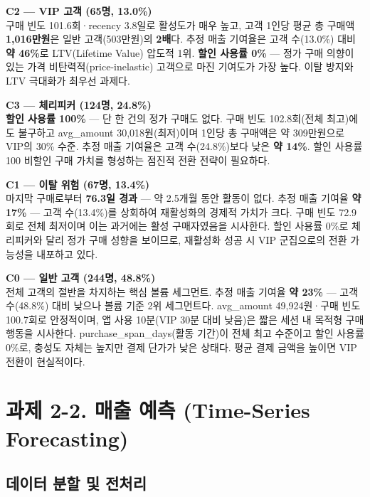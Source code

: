 \documentclass[a4paper, 11pt]{article}
\begin{document}
\textbf{C2 — VIP 고객 (65명, 13.0\%)}\\
구매 빈도 101.6회·recency 3.8일로 활성도가 매우 높고,
고객 1인당 평균 총 구매액 \textbf{1,016만원}은 일반 고객(503만원)의 \textbf{2배}다.
추정 매출 기여율은 고객 수(13.0\%) 대비 \textbf{약 46\%}로 LTV(Lifetime Value) 압도적 1위.
\textbf{할인 사용률 0\%} — 정가 구매 의향이 있는 가격 비탄력적(price-inelastic) 고객으로
마진 기여도가 가장 높다. 이탈 방지와 LTV 극대화가 최우선 과제다.

\medskip
\textbf{C3 — 체리피커 (124명, 24.8\%)}\\
\textbf{할인 사용률 100\%} — 단 한 건의 정가 구매도 없다.
구매 빈도 102.8회(전체 최고)에도 불구하고 avg\_amount 30,018원(최저)이며
1인당 총 구매액은 약 309만원으로 VIP의 30\% 수준.
추정 매출 기여율은 고객 수(24.8\%)보다 낮은 \textbf{약 14\%}.
할인 사용률 100%
비할인 구매 가치를 형성하는 점진적 전환 전략이 필요하다.

\medskip
\textbf{C1 — 이탈 위험 (67명, 13.4\%)}\\
마지막 구매로부터 \textbf{76.3일 경과} — 약 2.5개월 동안 활동이 없다.
추정 매출 기여율 \textbf{약 17\%} — 고객 수(13.4\%)를 상회하여 재활성화의 경제적 가치가 크다.
구매 빈도 72.9회로 전체 최저이며 이는 과거에는 활성 구매자였음을 시사한다.
할인 사용률 0\%로 체리피커와 달리 정가 구매 성향을 보이므로,
재활성화 성공 시 VIP 군집으로의 전환 가능성을 내포하고 있다.

\medskip
\textbf{C0 — 일반 고객 (244명, 48.8\%)}\\
전체 고객의 절반을 차지하는 핵심 볼륨 세그먼트.
추정 매출 기여율 \textbf{약 23\%} — 고객 수(48.8\%) 대비 낮으나 볼륨 기준 2위 세그먼트다.
avg\_amount 49,924원·구매 빈도 100.7회로 안정적이며,
앱 사용 10분(VIP 30분 대비 낮음)은 짧은 세션 내 목적형 구매 행동을 시사한다.
purchase\_span\_days(활동 기간)이 전체 최고 수준이고 할인 사용률 0\%로,
충성도 자체는 높지만 결제 단가가 낮은 상태다.
평균 결제 금액을 높이면 VIP 전환이 현실적이다.

\newpage
\section{과제 2-2. 매출 예측 (Time-Series Forecasting)}

\subsection{데이터 분할 및 전처리}
\end{document}
